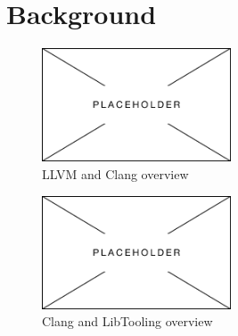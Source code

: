 \chapter{Background}

\begin{figure}[H]
    \centering
    \includegraphics[width=0.5\textwidth]{figs/030bac/placeholder.png}
    \caption{LLVM and Clang overview}
    \label{fig:030bac:llvmToolchainOverview}
\end{figure}

\begin{figure}[H]
    \centering
    \includegraphics[width=0.5\textwidth]{figs/030bac/placeholder.png}
    \caption{Clang and LibTooling overview}
    \label{fig:030bac:clangToolingOverview}
\end{figure}